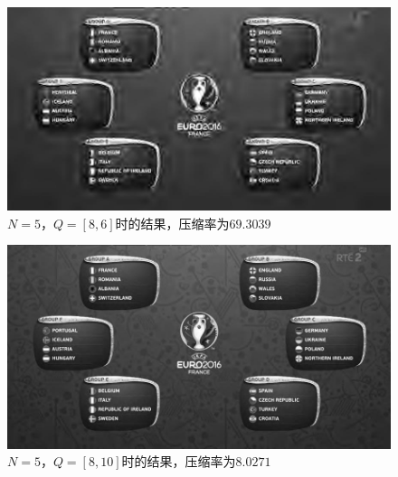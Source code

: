 \documentclass[UTF8]{ctexart}
\begin{document}
             			\begin{figure}[H]
             				\centering 
             				\includegraphics[scale=0.4]{n_5_q_8_6.jpg} 
             				\caption{$N = 5$，$Q = [8, 6]$时的结果，压缩率为$69.3039$} 
             				\label{n=5, Q=[8,6]}
             			\end{figure} 
                         
             			\begin{figure}[H]
             				\centering 
             				\includegraphics[scale=0.4]{n_5_q_8_10.jpg} 
             				\caption{$N = 5$，$Q = [8, 10]$时的结果，压缩率为$8.0271$} 
             				\label{n=5, Q=[8,10]}
             			\end{figure}                                                                                                        
                         
\end{document}
